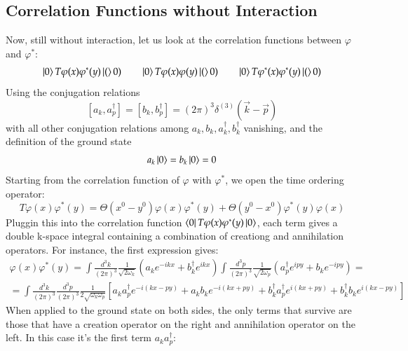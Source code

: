 \documentclass{article}
\begin{document}
\subsection{Correlation Functions without Interaction}
Now, still without interaction, let us look at the correlation functions between $\varphi$ and $\varphi^*$:
\begin{equation}
    \ket{0}T\varphi(x)\varphi^*(y)\ket(0)
    \qquad
    \ket{0}T\varphi(x)\varphi(y)\ket(0)
    \qquad
    \ket{0}T\varphi^*(x)\varphi^*(y)\ket(0)
\end{equation}
Using the conjugation relations
\begin{equation}
    \left[a_k, a_p^\dagger\right] = \left[b_k, b_p^\dagger\right] = (2\pi)^3\delta^{(3)}(\vec{k} - \vec{p})
\end{equation}
with all other conjugation relations among $a_k, b_k, a_k^\dagger, b_k^\dagger$ vanishing, and the definition of the ground state
\begin{equation}
    a_k \ket{0} = b_k \ket{0} = 0
\end{equation}
Starting from the correlation function of $\varphi$ with $\varphi^*$, we open the time ordering operator:
\begin{equation}
    T\varphi(x)\varphi^*(y) = \Theta(x^0 - y^0)\varphi(x)\varphi^*(y) + \Theta(y^0 - x^0)\varphi^*(y)\varphi(x)
\end{equation}
Pluggin this into the correlation function $\bra{0}T\varphi(x)\varphi^*(y)\ket{0}$, each term gives a double k-space integral containing a combination of creationg and annihilation operators. For instance, the first expression gives:
\begin{equation}
\begin{gathered}
    \varphi(x)\varphi^*(y) = \int \frac{d^3k}{(2\pi)^3}\frac{1}{\sqrt{2\omega_k}}\left(
        a_k e^{-ikx} + b_k^\dagger e^{ikx}
    \right) \int \frac{d^3p}{(2\pi)^3}\frac{1}{\sqrt{2\omega_p}}\left(
        a_p^\dagger e^{ipy} + b_k e^{-ipy}
    \right) = \\ =
    \int \frac{d^3k}{(2\pi)^3}\frac{d^3p}{(2\pi)^3}\frac{1}{2\sqrt{\omega_k\omega_p}}\left[
        a_ka_p^\dagger e^{-i(kx - py)} +
        a_k b_k e^{-i(kx + py)} +
        b_k^\dagger a_p^\dagger e^{i(kx + py)} +
        b_k^\dagger b_k e^{i(kx - py)}
    \right]
\end{gathered}
\end{equation}
When applied to the ground state on both sides, the only terms that survive are those that have a creation operator on the right and annihilation operator on the left. In this case it's the first term $a_ka_p^\dagger$:
\end{document}
